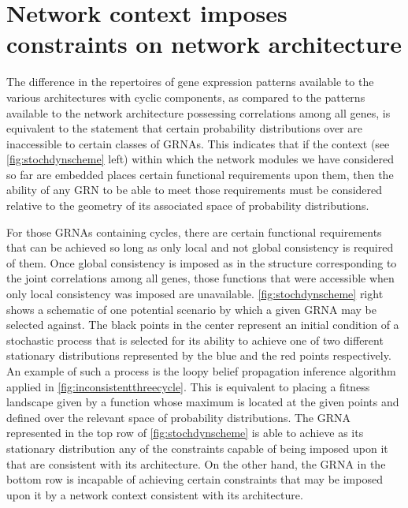 \section{Network context imposes constraints on network architecture}

The difference in the repertoires of gene expression patterns available to the various architectures with cyclic components, as compared to the patterns available to the network architecture possessing correlations among all genes, is equivalent to the statement that certain probability distributions over \gnpm{} are inaccessible to certain classes of GRNAs. This indicates that if the context (see \ref{fig:stochdynscheme} left) within which the network modules we have considered so far are embedded places certain functional requirements upon them, then the ability of any GRN to be able to meet those requirements must be considered relative to the geometry of its associated space of probability distributions.

For those GRNAs containing cycles, there are certain functional requirements that can be achieved so long as only local and not global consistency is required of them. Once global consistency is imposed as in the structure corresponding to the joint correlations among all genes, those functions that were accessible when only local consistency was imposed are unavailable. \ref{fig:stochdynscheme} right shows a schematic of one potential scenario by which a given GRNA may be selected against. The black points in the center represent an initial condition of a stochastic process that is selected for its ability to achieve one of two different stationary distributions represented by the blue and the red points respectively. An example of such a process is the loopy belief propagation inference algorithm applied in \ref{fig:inconsistentthreecycle}. This is equivalent to placing a fitness landscape given by a function whose maximum is located at the given points and defined over the relevant space of probability distributions. The GRNA represented in the top row of \ref{fig:stochdynscheme} is able to achieve as its stationary distribution any of the constraints capable of being imposed upon it that are consistent with its architecture. On the other hand, the GRNA in the bottom row is incapable of achieving certain constraints that may be imposed upon it by a network context consistent with its architecture.

